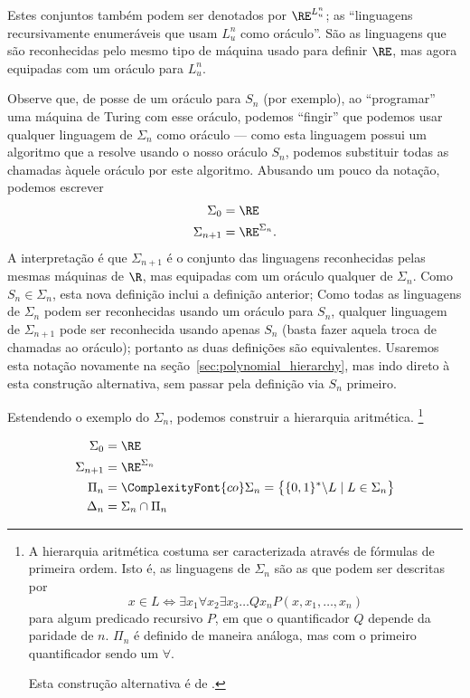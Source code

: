 Estes conjuntos também podem ser denotados por $\RE^{L_u^n}$;
as ``linguagens recursivamente enumeráveis que usam $L_u^n$ como oráculo''.
São as linguagens que são reconhecidas
pelo mesmo tipo de máquina usado para definir $\RE$,
mas agora equipadas com um oráculo para $L_u^n$.

Observe que,
de posse de um oráculo para $S_n$ (por exemplo),
ao ``programar'' uma máquina de Turing com esse oráculo,
podemos ``fingir'' que podemos usar qualquer linguagem de $\Sigma_n$ como oráculo
--- como esta linguagem possui um algoritmo que a resolve
usando o nosso oráculo $S_n$,
podemos substituir todas as chamadas àquele oráculo
por este algoritmo.
Abusando um pouco da notação,
podemos escrever
\begin{equation}
    \begin{aligned}
        \Sigma_0 &= \RE \\
        \Sigma_{n+1} &= \RE^{\Sigma_n}.
    \end{aligned}
    \label{eq:oracle_notation_abuse}
\end{equation}
A interpretação é que $\Sigma_{n+1}$ é o conjunto das linguagens
reconhecidas pelas mesmas máquinas de $\R$,
mas equipadas com um oráculo qualquer de $\Sigma_n$.
Como $S_n \in \Sigma_n$, esta nova definição inclui a definição anterior;
Como todas as linguagens de $\Sigma_n$
podem ser reconhecidas usando um oráculo para $S_n$,
qualquer linguagem de $\Sigma_{n+1}$
pode ser reconhecida usando apenas $S_n$
(basta fazer aquela troca de chamadas ao oráculo);
portanto as duas definições são equivalentes.
Usaremos esta notação novamente na seção~\ref{sec:polynomial_hierarchy},
mas indo direto à esta construção alternativa,
sem passar pela definição via $S_n$ primeiro.

Estendendo o exemplo do $\Sigma_n$,
podemos construir a hierarquia aritmética.%
\footnote{
    A hierarquia aritmética costuma ser caracterizada
    através de fórmulas de primeira ordem.
    Isto é,
    as linguagens de $\Sigma_n$ são as que podem ser descritas por
    \begin{equation*}
        x \in L \iff \exists x_1 \forall x_2 \exists x_3 \dots Q x_n P(x, x_1, \dots, x_n)
    \end{equation*}
    para algum predicado recursivo $P$,
    em que o quantificador $Q$ depende da paridade de $n$.
    $\Pi_n$ é definido de maneira análoga,
    mas com o primeiro quantificador sendo um $\forall$.

    Esta construção alternativa é de .
}
\begin{definition}
    \begin{align*}
        \Sigma_0 &= \RE \\
        \Sigma_{n+1} &= \RE^{\Sigma_n} \\
        \Pi_n &= \ComplexityFont{co}\Sigma_n =
            \big\{ \{0, 1\}^* \backslash L \mid L \in \Sigma_n \big\} \\
        \Delta_n &= \Sigma_n \cap \Pi_n \\
    \end{align*}
\end{definition}

